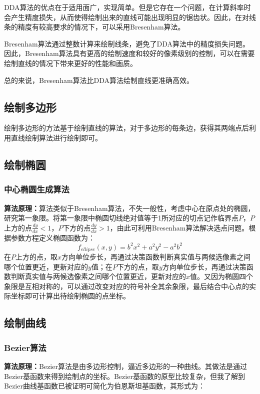 \documentclass[a4paper,UTF8]{article}
\theoremstyle{definition}
\begin{document}
DDA算法的优点在于适用面广，实现简单。但是它存在一个问题，在计算斜率时会产生精度损失，从而使得绘制出来的直线可能出现明显的锯齿状。因此，在对线条的精度有较高要求的情况下，可以采用Bresenham算法。

Bresenham算法通过整数计算来绘制线条，避免了DDA算法中的精度损失问题。因此，Bresenham算法具有更高的绘制速度和较好的像素级别的控制，可以在需要绘制直线的情况下带来更好的性能和画质。

总的来说，Bresenham算法比DDA算法绘制直线更准确高效。

\subsection{绘制多边形}

绘制多边形的方法基于绘制直线的算法，对于多边形的每条边，获得其两端点后利用直线绘制算法进行绘制即可。

\subsection{绘制椭圆}

\subsubsection{中心椭圆生成算法}

\textbf{算法原理：}算法类似于Bresenham算法，不失一般性，考虑中心在原点处的椭圆，研究第一象限。将第一象限中椭圆切线绝对值等于1所对应的切点记作临界点$P$，$P$上方的点$\frac{dy}{dx}<1$，$P$下方的点$\frac{dy}{dx}>1$，由此可利用Bresenham算法解决选点问题。根据参数方程定义椭圆函数为：
$$f_{ellipse}(x,y)=b^2x^2+a^2y^2-a^2b^2$$
在$P$上方的点，取$x$方向单位步长，再通过决策函数判断真实值与两候选像素之间哪个位置更近，更新对应的$y$值；在$P$下方的点，取$y$方向单位步长，再通过决策函数判断真实值与两候选像素之间哪个位置更近，更新对应的$x$值。又因为椭圆四个象限是互相对称的，可以通过改变对应的符号补全其余象限，最后结合中心点的实际坐标即可计算出待绘制椭圆的点坐标。

\subsection{绘制曲线}

\subsubsection{Bezier算法}

\textbf{算法原理：}Bezier算法是由多边形控制，逼近多边形的一种曲线。其做法是通过Bezier基函数来得到绘制点的坐标。Bezier基函数的原型比较复杂，但我了解到Bezier曲线基函数已被证明可简化为伯恩斯坦基函数，其形式为：
\end{document}
